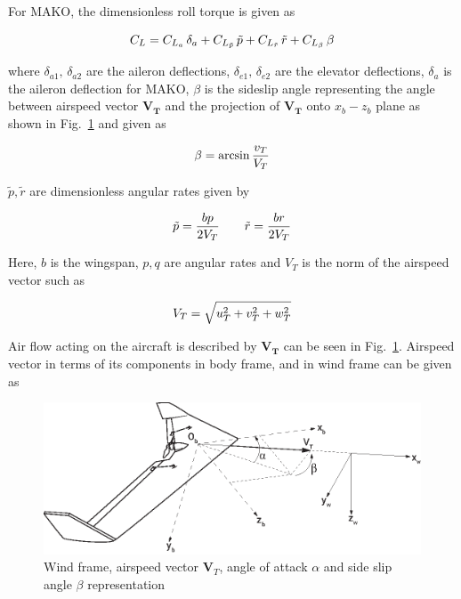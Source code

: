 For MAKO, the dimensionless roll torque is given as

\begin{equation}{\label{eqn:makoC_L}}
C_L = C_{L_{a}} \, \delta_{a} + C_{L_{\tilde{p}}} \, \tilde{p} + C_{L_{\tilde{r}}} \, \tilde{r} +  C_{L_\beta} \, \beta 
\end{equation}

where $\delta_{a1},\,\delta_{a2}$ are the aileron deflections, $\delta_{e1},\, \delta_{e2}$ are the elevator deflections, $\delta_a$ is the aileron deflection for MAKO, $\beta$ is the sideslip angle representing the angle between airspeed vector $\bm{V_T}$ and the projection of $\bm{V_T}$ onto $x_b-z_b$ plane as shown in Fig.~\ref{fig:windFrame} and given as 

\begin{equation}{\label{eqn:sideslipAngle}}
\beta = \arcsin{\frac{v_T}{V_T}}
\end{equation}

$\tilde{p}, \tilde{r}$ are dimensionless angular rates given by

 \begin{equation}{\label{eqn:dimensionlessAngularVelocties}}
\tilde{p}=\frac{bp}{2V_T} \qquad \tilde{r}=\frac{br}{2V_T}
\end{equation}

Here, $b$ is the wingspan, $p,q$ are angular rates and $V_T$ is the norm of the airspeed vector such as

\begin{equation}{\label{eqn:airspeedVector}}
V_T=\sqrt{u_T^2 + v_T^2 + w_T^2}
\end{equation}

Air flow acting on the aircraft is described by $\bm{V_T}$ can be seen in Fig.~\ref{fig:windFrame}. 
Airspeed vector in terms of its components in body frame, and in wind frame can be given as

\begin{figure}
\begin{center}
\includegraphics[width=15cm]{figures/ZagiWindframe}    %
\caption{Wind frame, airspeed vector $\bm{V}_T$, angle of attack $\alpha$ and side slip angle $\beta$ representation \cite{ducard2009fault}} 
\label{fig:windFrame}
\end{center}
\end{figure}


